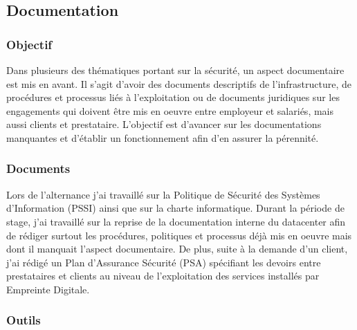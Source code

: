 \documentclass[12pt]{article}
\begin{document}
\newpage
\subsection{Documentation}
\subsubsection{Objectif}
Dans plusieurs des thématiques portant sur la sécurité, un aspect documentaire est mis en avant. 
Il s'agit d'avoir des documents descriptifs de l'infrastructure, de procédures et processus liés à l'exploitation ou de documents juridiques sur les engagements qui doivent être mis en oeuvre entre employeur et salariés, mais aussi clients et prestataire. 
L'objectif est d'avancer sur les documentations manquantes et d'établir un fonctionnement afin d'en assurer la pérennité.

\subsubsection{Documents}
Lors de l'alternance j'ai travaillé sur la Politique de Sécurité des Systèmes d'Information (PSSI) ainsi que sur la charte informatique. 
Durant la période de stage, j'ai travaillé sur la reprise de la documentation interne du datacenter afin de rédiger surtout les procédures, politiques et processus déjà mis en oeuvre mais dont il manquait l'aspect documentaire.
De plus, suite à la demande d'un client, j'ai rédigé un Plan d'Assurance Sécurité (PSA) spécifiant les devoirs entre prestataires et clients au niveau de l'exploitation des services installés par Empreinte Digitale.

\subsubsection{Outils}
\end{document}
